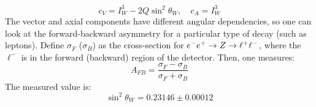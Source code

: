 \begin{itemize}
  \begin{equation}
    c_V = I^3_W - 2Q\sin^2\theta_W, \quad c_A = I_W^3
  \end{equation}
  The vector and axial components have different angular dependencies, so one can look at the forward-backward asymmetry for a particular type of decay (such as leptons). Define $\sigma_F$ ($\sigma_B$) as the cross-section for $e^{-}e^{+} \rightarrow Z \rightarrow \ell^+\ell^-$, where the $\ell^-$ is in the forward (backward) region of the detector. Then, one measures:
  \begin{equation}
    A_{FB} = \frac{\sigma_F - \sigma_B}{\sigma_F+\sigma_B}
  \end{equation}
  The measured value is:
  \begin{equation}
    \sin^2\theta_W = 0.23146\pm 0.00012
  \end{equation}
\end{itemize}

